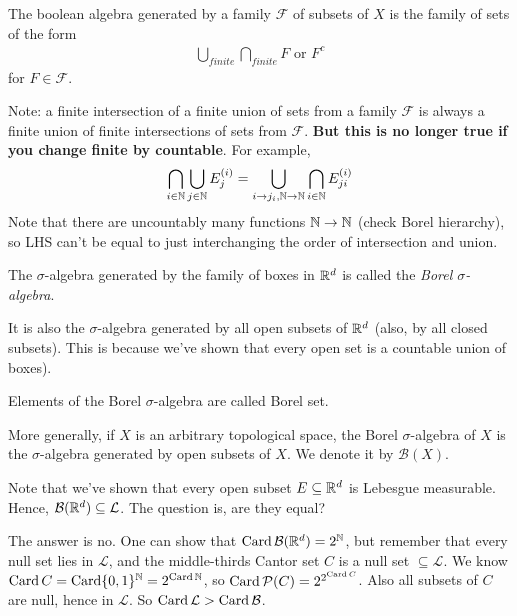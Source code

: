 \documentclass[a4paper]{article}
\begin{document}
\begin{rem}
The boolean algebra generated by a family $\mathcal{F}$ of subsets of $X$ is the family of sets of the form
\begin{equation*}
\begin{aligned}
\bigcup_{finite} \bigcap_{finite} F \text{ or } F^c
\end{aligned}
\end{equation*}
for $F \in \mathcal{F}$.
\end{rem}

Note: a finite intersection of a finite union of sets from a family $\mathcal{F}$ is always a finite union of finite intersections of sets from $\mathcal{F}$. \textbf{But this is no longer true if you change finite by countable}. For example,
\begin{equation*}
\begin{aligned}
\bigcap_{i \in \mathbb{N}} \bigcup_{j \in \mathbb{N}} E_j^{(i)} = \bigcup_{i \to j_i,\mathbb{N} \to \mathbb{N}} \bigcap_{i \in \mathbb{N}} E_{ji}^{(i)}
\end{aligned}
\end{equation*}
Note that there are uncountably many functions $\mathbb{N} \to \mathbb{N}$ (check Borel hierarchy), so LHS can't be equal to just interchanging the order of intersection and union.

\begin{defi}
The $\sigma$-algebra generated by the family of boxes in $\mathbb{R}^d$ is called the \emph{Borel $\sigma$-algebra}.
\end{defi}

\begin{rem}
It is also the $\sigma$-algebra generated by all open subsets of $\mathbb{R}^d$ (also, by all closed subsets). This is because we've shown that every open set is a countable union of boxes).
\end{rem}

Elements of the Borel $\sigma$-algebra are called Borel set.

\begin{rem}
More generally, if $X$ is an arbitrary topological space, the Borel $\sigma$-algebra of $X$ is the $\sigma$-algebra generated by open subsets of $X$. We denote it by $\mathcal{B}(X)$.
\end{rem}

Note that we've shown that every open subset $E \subseteq \mathbb{R}^d$ is Lebesgue measurable. Hence, $\mathcal{B}(\mathbb{R}^d) \subseteq \mathcal{L}$. The question is, are they equal?

The answer is no. One can show that $\operatorname{Card} \mathcal{B}(\mathbb{R}^d) = 2^{\mathbb{N}}$, but remember that every null set lies in $\mathcal{L}$, and the middle-thirds Cantor set $C$ is a null set $\subseteq \mathcal{L}$. We know $\operatorname{Card} C = \operatorname{Card} \{0,1\}^{\mathbb{N}} =2^{\operatorname{Card} \mathbb{N}}$, so $\operatorname{Card} \mathcal{P}(C) = 2^{2^{\operatorname{Card} C}}$. Also all subsets of $C$ are null, hence in $\mathcal{L}$. So $\operatorname{Card} \mathcal{L} > \operatorname{Card} \mathcal{B}$.
\end{document}
